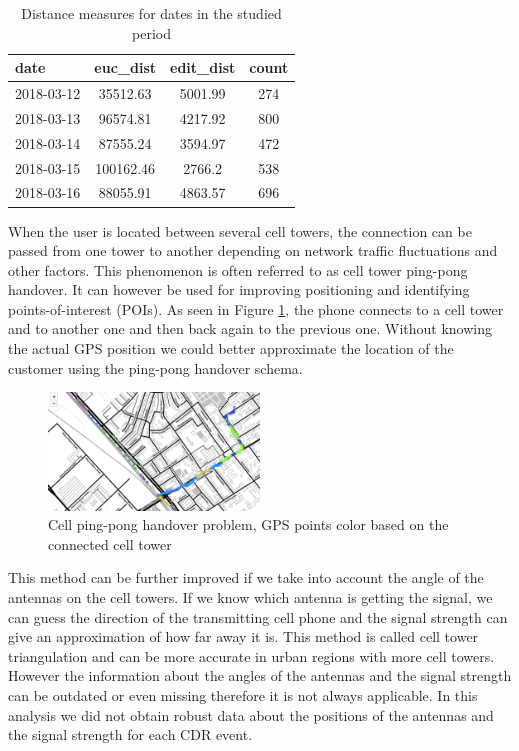 \begin{table}[h]
    \centering
    \begin{tabular}{|l|c|c|c|}
        \hline
        \textbf{date} & \textbf{euc\_dist} & \textbf{edit\_dist} & \textbf{count}\\
        \hline
        2018-03-12 & 35512.63 & 5001.99 & 274 \\
        \hline
        2018-03-13 & 96574.81 & 4217.92 & 800 \\
        \hline
        2018-03-14 & 87555.24 & 3594.97 & 472 \\
        \hline
        2018-03-15 & 100162.46 & 2766.2 & 538 \\
        \hline
        2018-03-16 & 88055.91 & 4863.57 & 696 \\
        \hline
    \end{tabular}
    \caption{Distance measures for dates in the studied period}
    \label{tab:distances}
\end{table}

When the user is located between several cell towers, the connection can be passed from one tower to another depending on network traffic fluctuations and other factors. This phenomenon is often referred to as cell tower ping-pong handover. It can however be used for improving positioning and identifying points-of-interest (POIs). As seen in Figure \ref{fig:ping-pong}, the phone connects to a cell tower and to another one and then back again to the previous one. Without knowing the actual GPS position we could better approximate the location of the customer using the ping-pong handover schema.

\begin{figure}[h]
    \centering
    \includegraphics[width=0.5\textwidth]{images/ping-pong.png}
    \caption{Cell ping-pong handover problem, GPS points color based on the connected cell tower}
    \label{fig:ping-pong}
\end{figure}

This method can be further improved if we take into account the angle of the antennas on the cell towers. If we know which antenna is getting the signal, we can guess the direction of the transmitting cell phone and the signal strength can give an approximation of how far away it is. This method is called cell tower triangulation and can be more accurate in urban regions with more cell towers. However the information about the angles of the antennas and the signal strength can be outdated or even missing therefore it is not always applicable. In this analysis we did not obtain robust data about the positions of the antennas and the signal strength for each CDR event.

